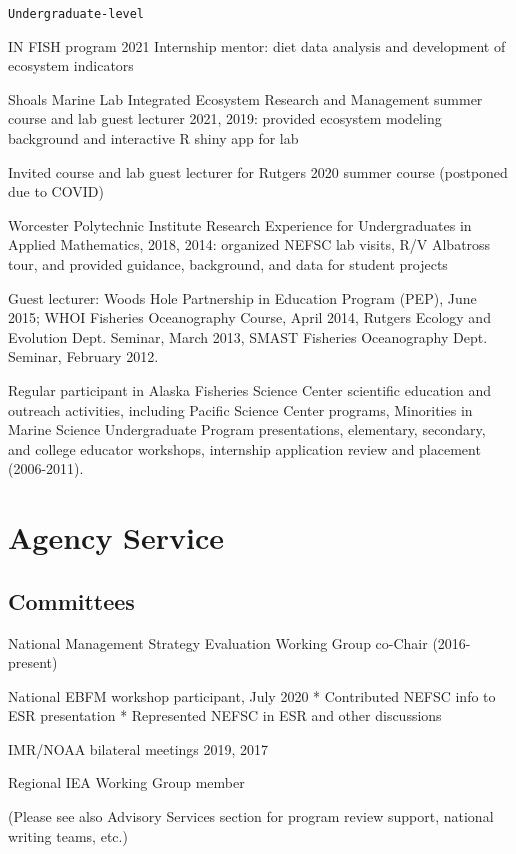 \documentclass[11pt, a4paper]{awesome-cv}
\begin{document}
\begin{verbatim}
Undergraduate-level
\end{verbatim}

IN FISH program 2021 Internship mentor: diet data analysis and
development of ecosystem indicators

Shoals Marine Lab Integrated Ecosystem Research and Management summer
course and lab guest lecturer 2021, 2019: provided ecosystem modeling
background and interactive R shiny app for lab

Invited course and lab guest lecturer for Rutgers 2020 summer course
(postponed due to COVID)

Worcester Polytechnic Institute Research Experience for Undergraduates
in Applied Mathematics, 2018, 2014: organized NEFSC lab visits, R/V
Albatross tour, and provided guidance, background, and data for student
projects

Guest lecturer: Woods Hole Partnership in Education Program (PEP), June
2015; WHOI Fisheries Oceanography Course, April 2014, Rutgers Ecology
and Evolution Dept. Seminar, March 2013, SMAST Fisheries Oceanography
Dept. Seminar, February 2012.

Regular participant in Alaska Fisheries Science Center scientific
education and outreach activities, including Pacific Science Center
programs, Minorities in Marine Science Undergraduate Program
presentations, elementary, secondary, and college educator workshops,
internship application review and placement (2006-2011).

\hypertarget{agency-service}{%
\section{Agency Service}\label{agency-service}}

\hypertarget{committees}{%
\subsection{Committees}\label{committees}}

National Management Strategy Evaluation Working Group co-Chair
(2016-present)

National EBFM workshop participant, July 2020 * Contributed NEFSC info
to ESR presentation * Represented NEFSC in ESR and other discussions

IMR/NOAA bilateral meetings 2019, 2017

Regional IEA Working Group member

(Please see also Advisory Services section for program review support,
national writing teams, etc.)
\end{document}
